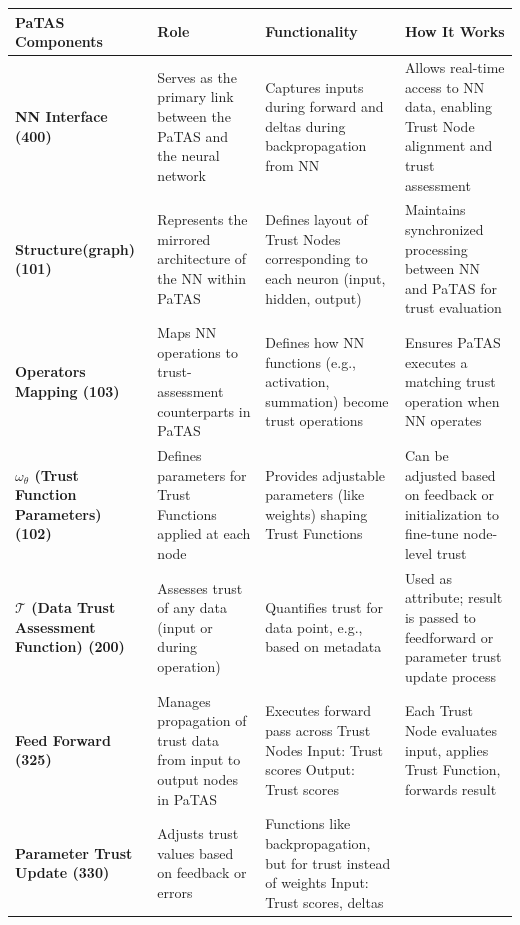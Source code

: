 \begin{table}[htbp]
\centering
\scriptsize
\begin{tabularx}{\textwidth}{|p{3.5cm}|X|X|X|}
\hline
\textbf{PaTAS Components} & \textbf{Role} & \textbf{Functionality} & \textbf{How It Works} \\
\hline

\textbf{NN Interface (400)} & 
Serves as the primary link between the PaTAS and the neural network & 
Captures inputs during forward and deltas during backpropagation from NN & 
Allows real-time access to NN data, enabling Trust Node alignment and trust assessment \\
\hline
\textbf{Structure(graph) (101)} & 
Represents the mirrored architecture of the NN within PaTAS & 
Defines layout of Trust Nodes corresponding to each neuron (input, hidden, output) & 
Maintains synchronized processing between NN and PaTAS for trust evaluation \\
\hline
\textbf{Operators Mapping (103)} & 
Maps NN operations to trust-assessment counterparts in PaTAS & 
Defines how NN functions (e.g., activation, summation) become trust operations & 
Ensures PaTAS executes a matching trust operation when NN operates \\
\hline
\textbf{$\omega_\theta$ (Trust Function Parameters) (102)} & 
Defines parameters for Trust Functions applied at each node & 
Provides adjustable parameters (like weights) shaping Trust Functions & 
Can be adjusted based on feedback or initialization to fine-tune node-level trust \\
\hline
\textbf{$\mathcal{T}$ (Data Trust Assessment Function) (200)} & 
Assesses trust of any data (input or during operation) & 
Quantifies trust for data point, e.g., based on metadata & 
Used as attribute; result is passed to feedforward or parameter trust update process \\
\hline
\textbf{Feed Forward (325)} & 
Manages propagation of trust data from input to output nodes in PaTAS & 
Executes forward pass across Trust Nodes \newline Input: Trust scores \newline Output: Trust scores & 
Each Trust Node evaluates input, applies Trust Function, forwards result \\
\hline
\textbf{Parameter Trust Update (330)} & 
Adjusts trust values based on feedback or errors & 
Functions like backpropagation, but for trust instead of weights \newline Input: Trust scores, deltas & 

\end{tabularx}
\end{table}
